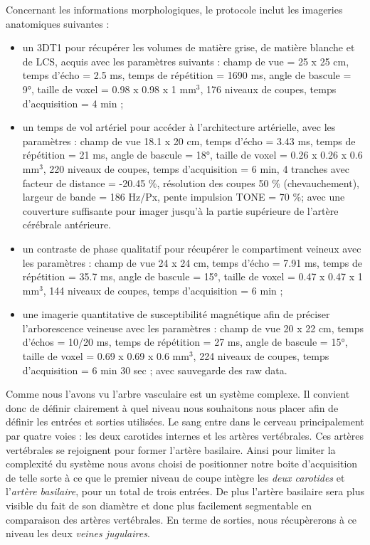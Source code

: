 Concernant les informations morphologiques, le protocole inclut les imageries anatomiques suivantes :
\begin{itemize}
\item un 3DT1 pour récupérer les volumes de matière grise, de matière blanche et de LCS, acquis avec les paramètres suivants : champ de vue = 25 x 25 cm, temps d’écho = 2.5 ms, temps de répétition = 1690 ms, angle de bascule = 9°, taille de voxel = 0.98 x 0.98 x 1 mm$^3$, 176 niveaux de coupes, temps d'acquisition = 4 min ;
\item un temps de vol artériel pour accéder à l’architecture artérielle, avec les paramètres : champ de vue 18.1 x 20 cm, temps d’écho = 3.43 ms, temps de répétition = 21 ms, angle de bascule = 18°, taille de voxel = 0.26 x 0.26 x 0.6 mm$^3$, 220 niveaux de coupes,  temps d'acquisition = 6 min, 4 tranches avec facteur de distance = -20.45 \%,  résolution des coupes 50 \% (chevauchement), largeur de bande = 186 Hz/Px, pente impulsion TONE = 70 \%; avec une couverture suffisante pour imager jusqu’à la partie supérieure de l’artère cérébrale antérieure.
\item un contraste de phase qualitatif pour récupérer le compartiment veineux avec les paramètres : champ de vue 24 x 24 cm, temps d’écho = 7.91 ms, temps de répétition = 35.7 ms, angle de bascule = 15°, taille de voxel = 0.47 x 0.47 x 1 mm$^3$, 144 niveaux de coupes,  temps d'acquisition = 6 min ;
\item une imagerie quantitative de susceptibilité magnétique afin de préciser l’arborescence veineuse avec les paramètres : champ de vue 20 x 22 cm, temps d’échos = 10/20 ms, temps de répétition = 27 ms, angle de bascule = 15°, taille de voxel = 0.69 x 0.69 x 0.6 mm$^3$, 224 niveaux de coupes,  temps d'acquisition = 6 min 30 sec ; avec sauvegarde des raw data.
\end{itemize}
Comme nous l’avons vu l’arbre vasculaire est un système complexe. Il convient donc de définir clairement à quel niveau nous souhaitons nous placer afin de définir les entrées et sorties utilisées. Le sang entre dans le cerveau principalement par quatre voies : les deux carotides internes et les artères vertébrales. Ces artères vertébrales se rejoignent pour former l’artère basilaire. Ainsi pour limiter la complexité du système nous avons choisi de positionner notre boite d’acquisition de telle sorte à ce que le premier niveau de coupe intègre les {\em deux carotides} et l’{\em artère basilaire}, pour un total de trois entrées. De plus l’artère basilaire sera plus visible du fait de son diamètre et donc plus facilement segmentable en comparaison des artères vertébrales. En terme de sorties, nous récupèrerons à ce niveau les deux {\em veines jugulaires}.

